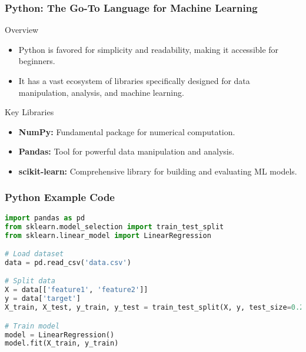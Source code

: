 \documentclass{beamer}
\begin{document}
\begin{frame}[fragile]
    \frametitle{Python: The Go-To Language for Machine Learning}
    \begin{block}{Overview}
        \begin{itemize}
            \item Python is favored for simplicity and readability, making it accessible for beginners.
            \item It has a vast ecosystem of libraries specifically designed for data manipulation, analysis, and machine learning.
        \end{itemize}
    \end{block}

    \begin{block}{Key Libraries}
        \begin{itemize}
            \item \textbf{NumPy:} Fundamental package for numerical computation. 
            \item \textbf{Pandas:} Tool for powerful data manipulation and analysis.
            \item \textbf{scikit-learn:} Comprehensive library for building and evaluating ML models.
        \end{itemize}
    \end{block}
\end{frame}

\begin{frame}[fragile]
    \frametitle{Python Example Code}
    \begin{lstlisting}[language=Python]
import pandas as pd
from sklearn.model_selection import train_test_split
from sklearn.linear_model import LinearRegression

# Load dataset
data = pd.read_csv('data.csv')

# Split data
X = data[['feature1', 'feature2']]
y = data['target']
X_train, X_test, y_train, y_test = train_test_split(X, y, test_size=0.2)

# Train model
model = LinearRegression()
model.fit(X_train, y_train)
    \end{lstlisting}
\end{frame}
\end{document}
